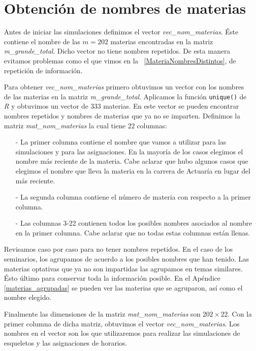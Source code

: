 \section{Obtención de nombres de materias} \label{Sec_NomMaterias}

Antes de iniciar las simulaciones definimos el vector \textit{vec\_nom\_materias}. Éste contiene el nombre de las $m = 202$ materias encontradas en la matriz \textit{m\_grande\_total}. Dicho vector  no tiene nombres repetidos. De esta manera evitamos problemas como el que vimos en la \figurename{~\ref{MateriaNombresDistintos}}, de repetición de información.

Para obtener \textit{vec\_nom\_materias} primero obtuvimos un vector con los nombres de las materias en la matriz \textit{m\_grande\_total}. Aplicamos la función \verb+unique()+ de \textit{R} y obtuvimos un vector de 333 materias. En este vector se pueden encontrar nombres repetidos y nombres de materias que ya no se imparten. Definimos la matriz \textit{mat\_nom\_materias} la cual tiene 22 columnas:

\begin{itemize}
\item[-] La primer columna contiene el nombre que vamos a utilizar para las simulaciones y para las asignaciones. En la mayoría de los casos elegimos el nombre más reciente de la materia. Cabe aclarar que hubo algunos casos que elegimos el nombre que lleva la materia en la carrera de Actuaría en lugar del más reciente.

\item[-] La segunda columna contiene el número de materia con respecto a la primer columna.

\item[-] Las columnas 3-22 contienen todos los posibles nombres asociados al nombre en la primer columna. Cabe aclarar que no todas estas columnas están llenas.
\end{itemize}

Revisamos caso por caso para no tener nombres repetidos. En el caso de los seminarios, los agrupamos de acuerdo a los posibles nombres que han tenido. Las materias optativas que ya no son impartidas las agrupamos en temas similares. Ésto último para conservar toda la información posible. En el Apéndice \ref{materias_agrupadas} se pueden ver las materias que se agruparon, así como el nombre elegido.%

Finalmente las dimensiones de la matriz \textit{mat\_nom\_materias} son $202 \times 22$. Con la primer columna de dicha matriz, obtuvimos el vector \textit{vec\_nom\_materias}. Los nombres en el vector son los que utilizaremos para realizar las simulaciones de esqueletos y las asignaciones de horarios.
